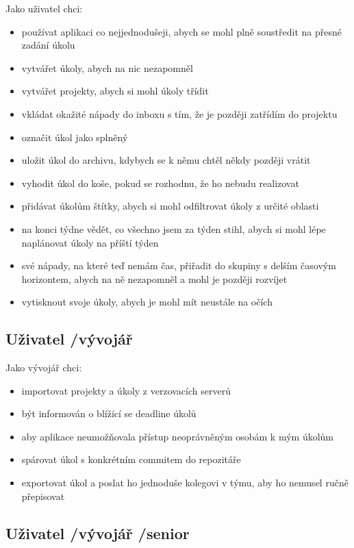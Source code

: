 Jako uživatel chci:

\begin{itemize}
\item používat aplikaci co nejjednodušeji, abych se mohl plně soustředit na přesné zadání úkolu
\item vytvářet úkoly, abych na nic nezapomněl
\item vytvářet projekty, abych si mohl úkoly třídit
\item vkládat okažité nápady do inboxu s tím, že je později zatřídím do projektu
\item označit úkol jako splněný
\item uložit úkol do archivu, kdybych se k němu chtěl někdy později vrátit
\item vyhodit úkol do koše, pokud se rozhodnu, že ho nebudu realizovat
\item přidávat úkolům štítky, abych si mohl odfiltrovat úkoly z určité oblasti
\item na konci týdne vědět, co všechno jsem za týden stihl, abych si mohl lépe naplánovat úkoly na příští týden
\item své nápady, na které teď nemám čas, přiřadit do skupiny s delším časovým horizontem, abych na ně nezapomněl a mohl je později rozvíjet
\item vytisknout svoje úkoly, abych je mohl mít neustále na očích
\end{itemize}

\subsection{Uživatel \slash  vývojář}

Jako vývojář chci:

\begin{itemize}
\item importovat projekty a úkoly z verzovacích serverů
\item být informován o blížící se deadline úkolů
\item aby aplikace neumožňovala přístup neoprávněným osobám k mým úkolům
\item spárovat úkol s konkrétním commitem do repozitáře
\item exportovat úkol a poslat ho jednoduše kolegovi v týmu, aby ho nemusel ručně přepisovat
\end{itemize}

\subsection{Uživatel \slash  vývojář \slash  senior}

